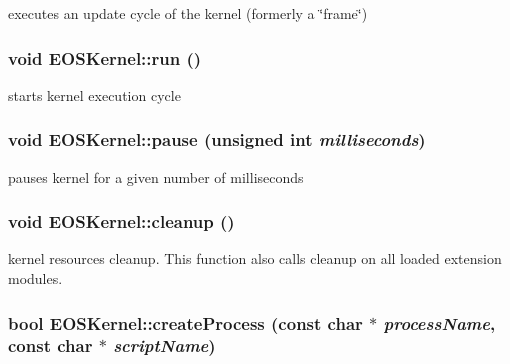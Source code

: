 executes an update cycle of the kernel (formerly a \char`\"{}frame\char`\"{}) 

\hypertarget{structEOSKernel_2659cec44279505b550ab273010cb6b9}{
\subsubsection[{run}]{\setlength{\rightskip}{0pt plus 5cm}void EOSKernel::run ()}}
\label{structEOSKernel_2659cec44279505b550ab273010cb6b9}


starts kernel execution cycle 

\hypertarget{structEOSKernel_c951ed12c4318cb8272849abf124ee51}{
\subsubsection[{pause}]{\setlength{\rightskip}{0pt plus 5cm}void EOSKernel::pause (unsigned int {\em milliseconds})}}
\label{structEOSKernel_c951ed12c4318cb8272849abf124ee51}


pauses kernel for a given number of milliseconds 

\hypertarget{structEOSKernel_f9ca04a44a732ba92ff65927f3757ffd}{
\subsubsection[{cleanup}]{\setlength{\rightskip}{0pt plus 5cm}void EOSKernel::cleanup ()}}
\label{structEOSKernel_f9ca04a44a732ba92ff65927f3757ffd}


kernel resources cleanup. This function also calls cleanup on all loaded extension modules. 

\hypertarget{structEOSKernel_a58308c8aa2b19378d24af1cb51b78d2}{
\subsubsection[{createProcess}]{\setlength{\rightskip}{0pt plus 5cm}bool EOSKernel::createProcess (const char $\ast$ {\em processName}, \/  const char $\ast$ {\em scriptName})}}
\label{structEOSKernel_a58308c8aa2b19378d24af1cb51b78d2}


